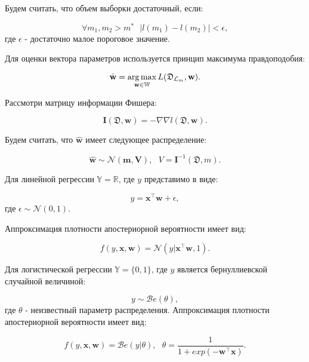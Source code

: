 \documentclass[12pt,twoside]{article}
\begin{document}
Будем считать, что объем выборки достаточный, если:

$$
\forall m_1, m_2 > m^* ~~~ |l(m_1) - l(m_2)| < \epsilon,
$$
где $\epsilon$ - достаточно малое пороговое значение.


Для оценки вектора параметров используется принцип максимума правдоподобия:

$$
\hat{\textbf{w}} = \argmax_{\textbf{w} \in \mathbb{W}} L(\mathfrak D_{\mathcal L_m}, \textbf{w}).
$$

Рассмотри матрицу информации Фишера:

$$
\textbf{I}(\mathfrak D, \textbf{w}) = -\nabla\nabla l(\mathfrak D, \textbf{w}).
$$

Будем считать, что $\hat{\textbf{w}}$ имеет следующее распределение:

$$
\hat{\textbf{w}} \sim \mathcal{N}(\textbf{m}, \textbf{V}),~~~ V = \textbf{I}^{-1}(\mathfrak D, m).
$$

Для линейной регрессии $\mathbb{Y} = \mathbb{R}$, где $y$ представимо в виде:

$$
y = \textbf{x}^{\top}\textbf{w} + \epsilon,
$$
где $\epsilon \sim \mathcal{N}(0, 1)$. 

Аппроксимация плотности апостериорной вероятности имеет вид:

$$
f(y, \textbf{x}, \textbf{w}) = \mathcal{N}(y|\textbf{x}^{\top}\textbf{w}, 1).
$$ 

Для логистической регрессии $\mathbb{Y} = \{0, 1\}$, где $y$ является бернуллиевской случайной величиной:

$$
y \sim \mathcal{B}e(\theta),
$$
где $\theta$ - неизвестный параметр распределения. Аппроксимация плотности апостериорной вероятности имеет вид:

$$
f(y, \textbf{x}, \textbf{w}) = \mathcal{B}e(y|\theta),~~~ \theta = \frac{1}{1 + exp(-\textbf{w}^{\top}\textbf{x})}.
$$
\end{document}

